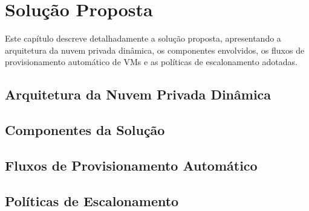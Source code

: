 \chapter{Solução Proposta}

Este capítulo descreve detalhadamente a solução proposta, apresentando a arquitetura da nuvem privada dinâmica, os componentes envolvidos, os fluxos de provisionamento automático de VMs e as políticas de escalonamento adotadas.

\section{Arquitetura da Nuvem Privada Dinâmica}

\section{Componentes da Solução}

\section{Fluxos de Provisionamento Automático}

\section{Políticas de Escalonamento}
